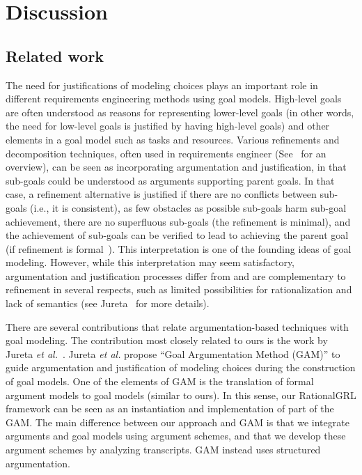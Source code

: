 \section{Discussion}
\label{sect:goalmodeling:discussion}

\subsection{Related work}
\label{sect:goalmodeling:relatedwork}

The need for justifications of modeling choices plays an important role in different requirements engineering methods using goal models. High-level goals are often understood as reasons for representing lower-level goals (in other words, the need for low-level goals is justified by having high-level goals) and other elements in a goal model such as tasks and resources. Various refinements and decomposition techniques,  often used in requirements engineer (See~\cite{EP-2001-Lamsweerde-GORE} for an overview), can be seen as incorporating argumentation and justification, in that sub-goals could be understood as arguments supporting parent goals. In that case, a refinement alternative is justified if there are no conflicts between sub-goals (i.e., it is consistent), as few obstacles as possible sub-goals harm sub-goal achievement, there are no superfluous sub-goals (the refinement is minimal), and the achievement of sub-goals can be verified to lead to achieving the parent goal (if refinement is formal~\cite{Darimont:1996:FRP:239098.239131}). This interpretation is one of the founding ideas of goal modeling. However, while this interpretation may seem satisfactory, argumentation and justification processes differ from and are complementary to refinement in several respects, such as limited possibilities for rationalization and lack of semantics (see Jureta~\cite{Jureta:RE2008} for more details).

There are several contributions that relate argumentation-based techniques with goal modeling. The contribution most closely related to ours is the work by Jureta \emph{et al.}~\cite{Jureta:RE2008}. Jureta \emph{et al.} propose ``Goal Argumentation Method (GAM)'' to guide argumentation and justification of modeling choices during the construction of goal models. One of the elements of GAM is the translation of formal argument models to goal models (similar to ours). In this sense, our RationalGRL framework can be seen as an instantiation and implementation of  part of the GAM. The main difference between our approach and GAM is that we integrate arguments and goal models using argument schemes, and that we develop these argument schemes by analyzing transcripts. GAM instead uses structured argumentation. 

